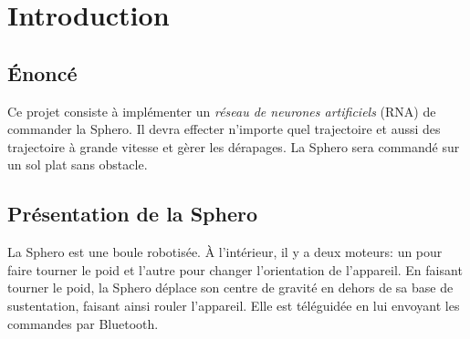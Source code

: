 \section{Introduction}
\subsection{Énoncé}
Ce projet consiste à implémenter un \emph{réseau de neurones artificiels} \hypertarget{rna}{(RNA)} de commander la Sphero.
Il devra effecter n'importe quel trajectoire et aussi des trajectoire à grande vitesse et gèrer les dérapages.
La Sphero sera commandé sur un sol plat sans obstacle.
\subsection{Présentation de la Sphero}
La Sphero est une boule robotisée.
À l'intérieur, il y a deux moteurs: un pour faire tourner le poid et l'autre pour changer l'orientation de l'appareil.
En faisant tourner le poid, la Sphero déplace son centre de gravité en dehors de sa base de sustentation, faisant ainsi rouler l'appareil.
Elle est téléguidée en lui envoyant les commandes par Bluetooth.
